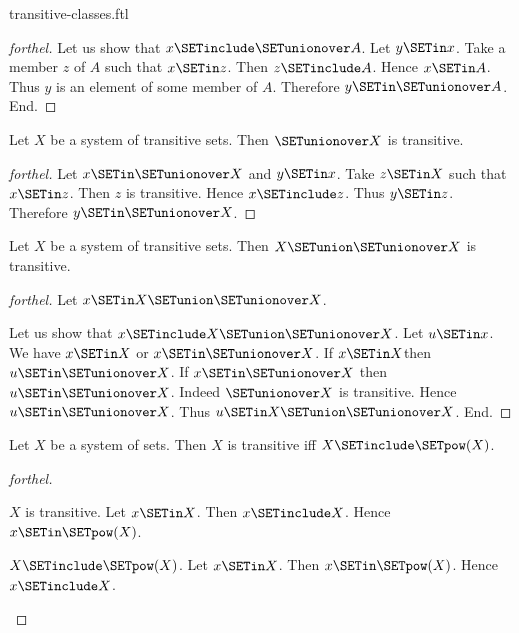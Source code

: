 \documentclass{naproche-library}
\begin{document}
\begin{smodule}[title=Transitive Classes]{transitive-classes.ftl}
\begin{proof}[forthel]
  Let us show that $x \SETinclude \SETunionover A$.
    Let $y \SETin x$.
    Take a member $z$ of $A$ such that $x \SETin z$.
    Then $z \SETinclude A$.
    Hence $x \SETin A$.
    Thus $y$ is an element of some member of $A$.
    Therefore $y \SETin \SETunionover A$.
  End.
\end{proof}

\begin{proposition}[forthel,id=SET_THEORY_01_6726468811882496]
  Let $X$ be a system of transitive sets.
  Then $\SETunionover X$ is transitive.
\end{proposition}
\begin{proof}[forthel]
  Let $x \SETin \SETunionover X$ and $y \SETin x$.
  Take $z \SETin X$ such that $x \SETin z$.
  Then $z$ is transitive.
  Hence $x \SETinclude z$.
  Thus $y \SETin z$.
  Therefore $y \SETin \SETunionover X$.
\end{proof}

\begin{proposition}[forthel,id=SET_THEORY_01_4884401668227072]
  Let $X$ be a system of transitive sets.
  Then $X \SETunion \SETunionover X$ is transitive.
\end{proposition}
\begin{proof}[forthel]
  Let $x \SETin X \SETunion \SETunionover X$.

  Let us show that $x \SETinclude X \SETunion \SETunionover X$.
    Let $u \SETin x$.
    We have $x \SETin X$ or $x \SETin \SETunionover X$.
    If $x \SETin X$then $u \SETin \SETunionover X$.
    If $x \SETin \SETunionover X$ then $u \SETin \SETunionover X$.
    Indeed $\SETunionover X$ is transitive.
    Hence $u \SETin \SETunionover X$.
    Thus $u \SETin X \SETunion \SETunionover X$.
  End.
\end{proof}

\begin{proposition}[forthel,id=SET_THEORY_01_1399002962591744]
  Let $X$ be a system of sets.
  Then $X$ is transitive iff $X \SETinclude \SETpow(X)$.
\end{proposition}
\begin{proof}[forthel]
  \begin{case}{$X$ is transitive.}
    Let $x \SETin X$.
    Then $x \SETinclude X$.
    Hence $x \SETin \SETpow(X)$.
  \end{case}

  \begin{case}{$X \SETinclude \SETpow(X)$.}
    Let $x \SETin X$.
    Then $x \SETin \SETpow(X)$.
    Hence $x \SETinclude X$.
  \end{case}
\end{proof}


\end{smodule}
\end{document}
